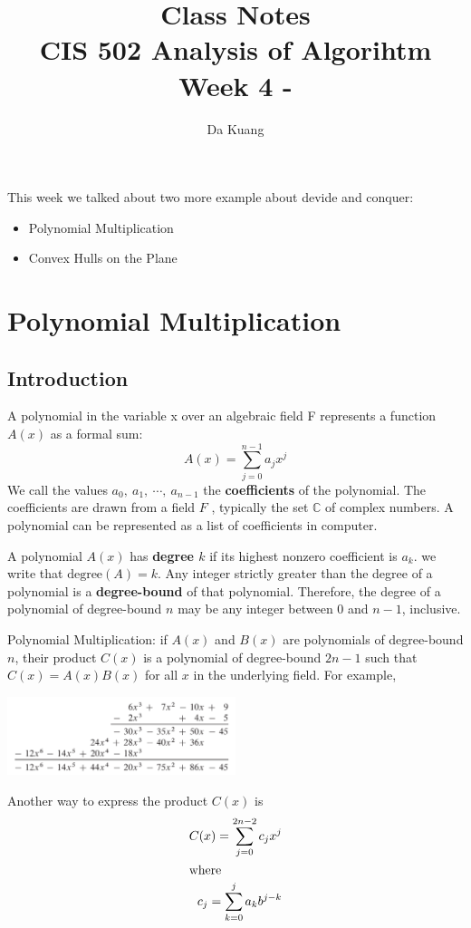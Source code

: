 \documentclass[en,hazy,blue,screen,14pt]{elegantnote}
\title{Class Notes\\CIS 502 Analysis of Algorihtm\\Week 4 - }
\author{Da Kuang}
\institute{University of Pennsylvania}
\date{}
\begin{document}
\maketitle
\newpage
This week we talked about two more example about devide and conquer:
\begin{itemize}
 \item Polynomial Multiplication
 \item Convex Hulls on the Plane
\end{itemize}

\section{Polynomial Multiplication}
\subsection{Introduction}
A polynomial in the variable x over an algebraic field F represents a function 
$A(x)$ as a formal sum:
\[A(x) = \sum_{j = 0}^{n-1} a_j x^j\]
We call the values $a_0, ~a_1, ~\cdots, ~a_{n-1}$ the \textbf{coefficients} of 
the polynomial. The coefficients are drawn from a field $F$ , typically the set 
$\mathbb{C}$ of complex numbers. A polynomial can be represented as a list of 
coefficients in computer.

A polynomial $A(x)$ has \textbf{degree $k$} if its highest nonzero coefficient 
is $a_k$. we write that $\text{degree}(A) = k$. Any integer strictly greater 
than the degree of a polynomial is a \textbf{degree-bound }of that polynomial. 
Therefore, the degree of a polynomial of degree-bound $n$ may be any integer 
between $0$ and $n-1$, inclusive.

Polynomial Multiplication: if $A(x)$ and $B(x)$ are polynomials of degree-bound 
$n$, their product $C(x)$ is a polynomial of degree-bound $2n - 1$ such that
$C(x) = A(x)B(x)$ for all $x$ in the underlying field. For example,

\centerline{\includegraphics[width=0.5\textwidth]{poly-multiply.png}}

Another way to express the product $C(x)$ is
\begin{align*}
 C(x) = \sum_{j=0}^{2n-2} c_j x^j\\
 \intertext{where}
 c_j = \sum_{k=0}^j a_k b^{j-k}
\end{align*}
\end{document}
